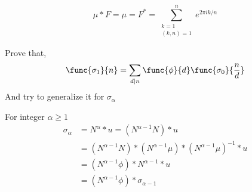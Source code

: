 \begin{exercise}
\begin{solution}
\begin{enumerate}
\begin{equation*}
                \mu \ast F = \mu = F^{\ast} = \sum_{\substack{k = 1\\(k,n) = 1}}^n e^{2 \pi i k/n}
            \end{equation*}
    \end{enumerate}
    \end{solution}
    \item Prove that,
    \begin{equation*}
        \func{\sigma_1}{n} = \sum_{d \mid n} \func{\phi}{d} \func{\sigma_0}{\frac{n}{d}}
    \end{equation*}
    And try to generalize it for \(\sigma_{\alpha}\)
    \begin{solution}
        For integer \(\alpha \geq 1\)
        \begin{align*}
            \sigma_{\alpha} &= N^{\alpha} \ast u = (N^{\alpha - 1} N) \ast u\\
            &=  (N^{\alpha - 1} N)  \ast (N^{\alpha- 1} \mu) \ast (N^{\alpha - 1} \mu)^{-1} \ast u\\
            &= (N^{\alpha - 1} \phi) \ast N^{\alpha - 1} \ast u\\
            &= (N^{\alpha - 1} \phi) \ast \sigma_{\alpha - 1}
        \end{align*}
    \end{solution}
    \item 
\end{exercise}